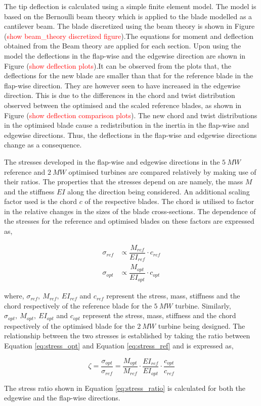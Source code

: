 The tip deflection is calculated using a simple finite element model. The model is based on the Bernoulli beam theory which is applied to the blade modelled as a cantilever beam. The blade discretized using the beam theory is shown in Figure (\textcolor{red}{show beam_theory discretized figure}).The equations for moment and deflection obtained from the Beam theory are applied for each section. Upon using the model the deflections in the flap-wise and the edgewise direction are shown in Figure (\textcolor{red}{show deflection plots}).It can be observed from the plots that, the deflections for the new blade are smaller than that for the reference blade in the flap-wise direction. They are however seen to have increased in the edgewise direction. This is due to the differences in the chord and twist distribution observed between the optimised and the scaled reference blades, as shown in Figure (\textcolor{red}{show deflection comparison plots}). The new chord and twist distributions in the optimised blade cause a redistribution in the inertia in the flap-wise and edgewise directions. Thus, the deflections in the flap-wise and edgewise directions change as a consequence. 

The stresses developed in the flap-wise and edgewise directions in the $5\ MW$ reference and $2\ MW$ optimised turbines are compared relatively by making use of their ratios. The properties that the stresses depend on are namely, the mass $M$ and the stiffness $EI$ along the direction being considered. An additional scaling factor used is the chord $c$ of the respective blades. The chord is utilised to factor in the relative changes in the sizes of the blade cross-sections. The dependence of the stresses for the reference and optimised blades on these factors are expressed as,

\begin{align}
    \sigma_{ref} &\propto \dfrac{M_{ref}}{EI_{ref}}\cdot c_{ref} \label{eq:stress_ref} \\
    \sigma_{opt} &\propto \dfrac{M_{opt}}{EI_{opt}}\cdot c_{opt} \label{eq:stress_opt}
\end{align}

where, $\sigma_{ref},\ M_{ref},\ EI_{ref}$ and $c_{ref}$ represent the stress, mass, stiffness and the chord respectively of the reference blade for the  $5\ MW$ turbine. Similarly, $\sigma_{opt},\ M_{opt},\ EI_{opt}$ and $c_{opt}$ represent the stress, mass, stiffness and the chord respectively of the optimised blade for the  $2\ MW$ turbine being designed. The relationship between the two stresses is established by taking the ratio between Equation \ref{eq:stress_opt} and Equation \ref{eq:stress_ref} and is expressed as,

\begin{equation}
     \zeta = \dfrac{\sigma_{opt}}{\sigma_{ref}} = \dfrac{M_{opt}}{M_{ref}}\cdot\dfrac{EI_{ref}}{EI_{opt}}\cdot \dfrac{c_{opt}}{c_{ref}}
\label{eq:stress_ratio}
\end{equation}

The stress ratio shown in Equation \ref{eq:stress_ratio} is calculated for both the edgewise and the flap-wise directions.